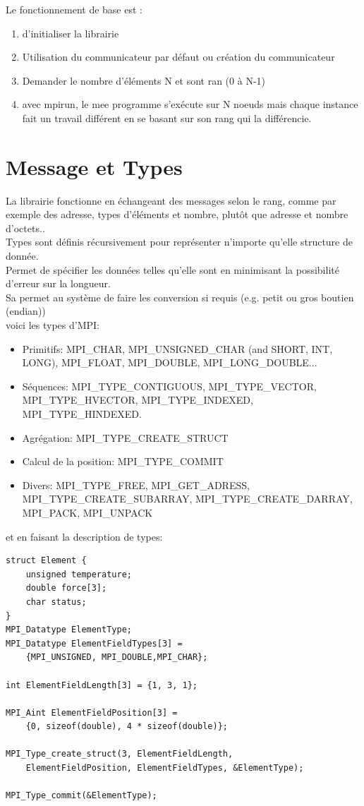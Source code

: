 \documentclass[oneside]{book}
\begin{document}
Le fonctionnement de base est :
\begin{enumerate}
\item d'initialiser la librairie
\item Utilisation du communicateur par défaut ou création du communicateur
\item Demander le nombre d'éléments N et sont ran (0 à N-1)
\item avec mpirun, le mee programme s'exécute sur N noeuds mais chaque instance fait un travail différent en se basant sur son rang qui la différencie.
\end{enumerate}

\section{Message et Types}
La librairie fonctionne en échangeant des messages selon le rang, comme par exemple des adresse, types d'éléments et nombre, plutôt que adresse et nombre d'octets..\\

Types sont définis récursivement pour représenter n'importe qu'elle structure de donnée. \\

Permet de spécifier les données telles qu'elle sont en minimisant la possibilité d'erreur sur la longueur.\\

Sa permet au système de faire les conversion si requis (e.g. petit ou gros boutien (endian))\\

voici les types d'MPI:
\begin{itemize}
\item Primitifs: MPI\_CHAR, MPI\_UNSIGNED\_CHAR (and SHORT, INT,
LONG), MPI\_FLOAT, MPI\_DOUBLE, MPI\_LONG\_DOUBLE...
\item Séquences: MPI\_TYPE\_CONTIGUOUS, MPI\_TYPE\_VECTOR,
MPI\_TYPE\_HVECTOR, MPI\_TYPE\_INDEXED,
MPI\_TYPE\_HINDEXED.
\item Agrégation: MPI\_TYPE\_CREATE\_STRUCT
\item Calcul de la position: MPI\_TYPE\_COMMIT
\item Divers: MPI\_TYPE\_FREE, MPI\_GET\_ADRESS,
MPI\_TYPE\_CREATE\_SUBARRAY,
MPI\_TYPE\_CREATE\_DARRAY, MPI\_PACK, MPI\_UNPACK
\end{itemize}
et en faisant la description de types:
\begin{lstlisting}
struct Element {
	unsigned temperature;
	double force[3];
	char status;
}
MPI_Datatype ElementType;
MPI_Datatype ElementFieldTypes[3] =
	{MPI_UNSIGNED, MPI_DOUBLE,MPI_CHAR};

int ElementFieldLength[3] = {1, 3, 1};

MPI_Aint ElementFieldPosition[3] =
	{0, sizeof(double), 4 * sizeof(double)};

MPI_Type_create_struct(3, ElementFieldLength,
	ElementFieldPosition, ElementFieldTypes, &ElementType);

MPI_Type_commit(&ElementType);
\end{lstlisting}
\end{document}
